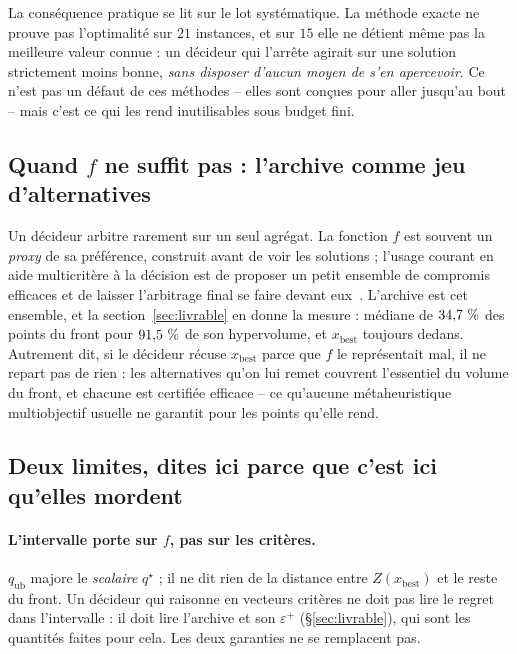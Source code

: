 \documentclass[11pt,a4paper]{article}
\theoremstyle{plain}
\theoremstyle{remark}
\newcommand{\qs}{q^{\star}}
\begin{document}
La conséquence pratique se lit sur le lot systématique. La méthode exacte ne
prouve pas l'optimalité sur $21$ instances, et sur $15$ elle
ne détient même pas la meilleure valeur connue : un décideur qui l'arrête
agirait sur une solution strictement moins bonne, \emph{sans disposer d'aucun
moyen de s'en apercevoir}. Ce n'est pas un défaut de ces méthodes -- elles
sont conçues pour aller jusqu'au bout -- mais c'est ce qui les rend
inutilisables sous budget fini.

\subsection{Quand $f$ ne suffit pas : l'archive comme jeu d'alternatives}

Un décideur arbitre rarement sur un seul agrégat. La fonction $f$ est
souvent un \emph{proxy} de sa préférence, construit avant de voir les
solutions ; l'usage courant en aide multicritère à la décision est de
proposer un petit ensemble de compromis efficaces et de laisser l'arbitrage
final se faire devant eux~\cite{roy1985}. L'archive est cet ensemble, et la
section~\ref{sec:livrable} en donne la mesure : médiane de $34{,}7{}\ \%$ des
points du front pour $91{,}5{}\ \%$ de son hypervolume, et $x_{\text{best}}$
toujours dedans. Autrement dit, si le décideur récuse $x_{\text{best}}$ parce
que $f$ le représentait mal, il ne repart pas de rien : les alternatives
qu'on lui remet couvrent l'essentiel du volume du front, et chacune est
certifiée efficace -- ce qu'aucune métaheuristique multiobjectif usuelle ne
garantit pour les points qu'elle rend.

\subsection{Deux limites, dites ici parce que c'est ici qu'elles mordent}

\paragraph{L'intervalle porte sur $f$, pas sur les critères.} $q_{\text{ub}}$
majore le \emph{scalaire} $\qs$ ; il ne dit rien de la distance entre
$Z(x_{\text{best}})$ et le reste du front. Un décideur qui raisonne en
vecteurs critères ne doit pas lire le regret dans l'intervalle : il doit lire
l'archive et son $\varepsilon^+$ (\S\ref{sec:livrable}), qui sont les
quantités faites pour cela. Les deux garanties ne se remplacent pas.
\end{document}
